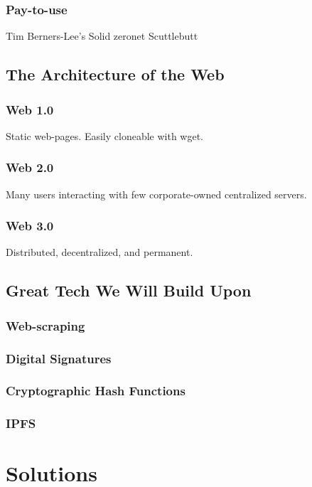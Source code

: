 \subsection{Pay-to-use}

Tim Berners-Lee's Solid
zeronet
Scuttlebutt


\section{The Architecture of the Web}

\subsection{Web 1.0}
Static web-pages.
Easily cloneable with wget.

\subsection{Web 2.0}
Many users interacting with few corporate-owned centralized servers.

\subsection{Web 3.0}
Distributed, decentralized, and permanent.

\section{Great Tech We Will Build Upon}
\subsection{Web-scraping}

\subsection{Digital Signatures}

\subsection{Cryptographic Hash Functions}

\subsection{IPFS}

\chapter{Solutions}

